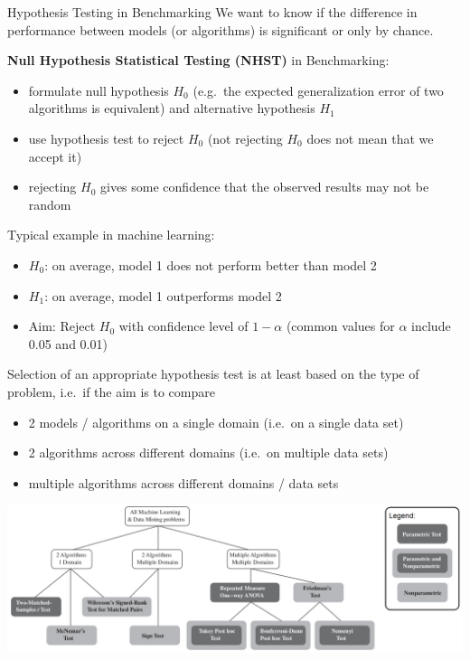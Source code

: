     \begin{frame}[c,allowframebreaks]{Hypothesis Testing in Benchmarking}
    We want to know if the difference in performance between models (or algorithms) is significant or only by chance.

    \textbf{Null Hypothesis Statistical Testing (NHST)} in Benchmarking:

    \begin{itemize}
    \item formulate null hypothesis $H_0$ (e.g.\ the expected generalization
        error of two algorithms is equivalent) and alternative hypothesis $H_1$
    \item use hypothesis test to reject $H_0$ (not rejecting $H_0$ does not mean that we accept it)
    \item rejecting $H_0$ gives some confidence that the observed results may
        not be random
    \end{itemize}

    Typical example in machine learning:

    \begin{itemize}
    \item $H_0$: on average, model 1 does not perform better than model 2
    \item $H_1$: on average, model 1 outperforms model 2
    \item Aim: Reject $H_0$ with confidence level of $1-\alpha$ (common values
        for $\alpha$ include 0.05 and 0.01)
    \end{itemize}

    \framebreak

    Selection of an appropriate hypothesis test is at least based on the type of
    problem, i.e.\ if the aim is to compare
    \begin{itemize}
    \item 2 models / algorithms on a single domain (i.e.\ on a single data set)
    \item 2 algorithms across different domains (i.e.\ on multiple data sets)
    \item multiple algorithms across different domains / data sets
    \end{itemize}

    \begin{center}
    \includegraphics[height=.5\textheight]{images/tests_overview}
    \end{center}

    \end{frame}

